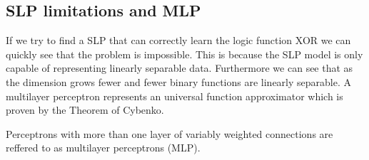 \subsection{SLP limitations and MLP}
If we try to find a SLP that can correctly learn the logic function XOR we can quickly see that the problem is impossible. This is because the SLP model is only capable of representing linearly separable data. Furthermore we can see that as the dimension grows fewer and fewer binary functions are linearly separable.  A multilayer perceptron represents an universal function approximator which is proven by the Theorem of Cybenko. 
\begin{definition}
    Perceptrons with more than one layer of variably weighted connections are reffered to as multilayer perceptrons (MLP).
\end{definition}
